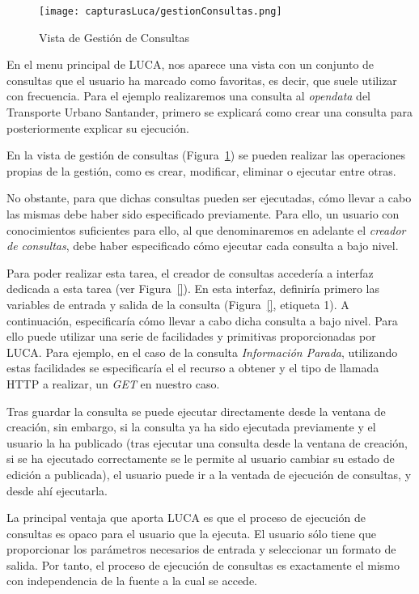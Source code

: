 \begin{figure}[!tb]
    \centering
 	\texttt{[image: capturasLuca/gestionConsultas.png]}
	\caption{Vista de Gestión de Consultas}
    \label{fig:gestionConsulta}
\end{figure}

En el menu principal de LUCA, nos aparece una vista con un conjunto de consultas que el usuario ha marcado como favoritas, es decir, que suele utilizar con frecuencia. Para el ejemplo realizaremos una consulta al \emph{opendata} del Transporte Urbano Santander, primero se explicará como crear una consulta para posteriormente explicar su ejecución.

En la vista de gestión de consultas (Figura~\ref{fig:gestionConsulta}) se pueden realizar las operaciones propias de la gestión, como es crear, modificar, eliminar o ejecutar entre otras.

No obstante, para que dichas consultas pueden ser ejecutadas, cómo llevar a cabo las mismas debe haber sido especificado previamente. Para ello, un usuario con conocimientos suficientes para ello, al que denominaremos en adelante el \emph{creador de consultas}, debe haber especificado cómo ejecutar cada consulta a bajo nivel.

Para poder realizar esta tarea, el creador de consultas accedería a interfaz dedicada a esta tarea (ver Figura~\ref{}). En esta interfaz, definiría primero las variables de entrada y salida de la consulta (Figura~\ref{}, etiqueta 1). A continuación, especificaría cómo llevar a cabo dicha consulta a bajo nivel. Para ello puede utilizar una serie de facilidades y primitivas proporcionadas por LUCA. Para ejemplo, en el caso de la consulta \emph{Información Parada}, utilizando estas facilidades se especificaría el el recurso a obtener y el tipo de llamada HTTP a realizar, un \emph{GET} en nuestro caso.

Tras guardar la consulta se puede ejecutar directamente desde la ventana de creación, sin embargo, si la consulta ya ha sido ejecutada previamente y el usuario la ha publicado (tras ejecutar una consulta desde la ventana de creación, si se ha ejecutado correctamente se le permite al usuario cambiar su estado de edición a publicada), el usuario puede ir a la ventada de ejecución de consultas, y desde ahí ejecutarla.

La principal ventaja que aporta LUCA es que el proceso de ejecución de consultas es opaco para el usuario que la ejecuta. El usuario sólo tiene que proporcionar los parámetros necesarios de entrada y seleccionar un formato de salida. Por tanto, el proceso de ejecución de consultas es exactamente el mismo con independencia de la fuente a la cual se accede.

